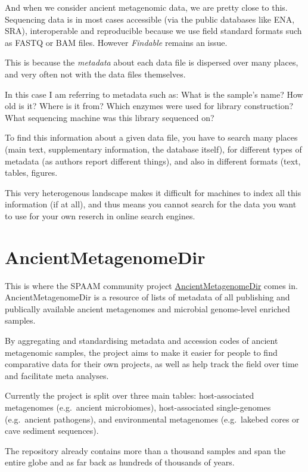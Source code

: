 \documentclass[
  letterpaper,
]{book}
\begin{document}
And when we consider ancient metagenomic data, we are pretty close to
this. Sequencing data is in most cases accessible (via the public
databases like ENA, SRA), interoperable and reproducible because we use
field standard formats such as FASTQ or BAM files. However
\emph{Findable} remains an issue.

This is because the \emph{metadata} about each data file is dispersed
over many places, and very often not with the data files themselves.

In this case I am referring to metadata such as: What is the sample's
name? How old is it? Where is it from? Which enzymes were used for
library construction? What sequencing machine was this library sequenced
on?

To find this information about a given data file, you have to search
many places (main text, supplementary information, the database itself),
for different types of metadata (as authors report different things),
and also in different formats (text, tables, figures.

This very heterogenous landscape makes it difficult for machines to
index all this information (if at all), and thus means you cannot search
for the data you want to use for your own reserch in online search
engines.

\hypertarget{ancientmetagenomedir}{%
\section{AncientMetagenomeDir}\label{ancientmetagenomedir}}

This is where the SPAAM community project
\href{https://github.com/spaam-community/AncientMetagenomeDir}{AncientMetagenomeDir}
comes in. AncientMetagenomeDir is a resource of lists of metadata of all
publishing and publically available ancient metagenomes and microbial
genome-level enriched samples.

By aggregating and standardising metadata and accession codes of ancient
metagenomic samples, the project aims to make it easier for people to
find comparative data for their own projects, as well as help track the
field over time and facilitate meta analyses.

Currently the project is split over three main tables: host-associated
metagenomes (e.g.~ancient microbiomes), host-associated single-genomes
(e.g.~ancient pathogens), and environmental metagenomes (e.g.~lakebed
cores or cave sediment sequences).

The repository already contains more than a thousand samples and span
the entire globe and as far back as hundreds of thousands of years.
\end{document}
